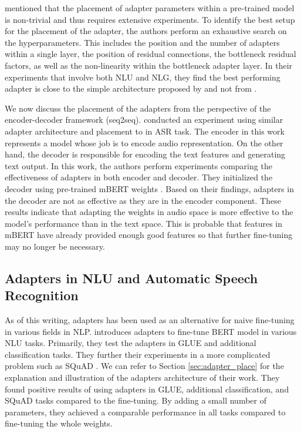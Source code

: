 \cite{pfeiffer2021adapterfusion} mentioned that the placement of adapter parameters within a pre-trained model is non-trivial and thus requires extensive experiments. To identify the best setup for the placement of the adapter, the authors perform an exhaustive search on the hyperparameters. This includes the position and the number of adapters within a single layer, the position of residual connections, the bottleneck residual factors, as well as the non-linearity within the bottleneck adapter layer. In their experiments that involve both NLU and NLG, they find the best performing adapter is close to the simple architecture proposed by \cite{bapna2019simple} and not from \cite{houlsby2019parameter}.

We now discuss the placement of the adapters from the perspective of the encoder-decoder framework (seq2seq). \cite{winata2020adapt} conducted an experiment using similar adapter architecture and placement to \cite{bapna2019simple} in ASR task. The encoder in this work represents a model whose job is to encode audio representation. On the other hand, the decoder is responsible for encoding the text features and generating text output. In this work, the authors perform experiments comparing the effectiveness of adapters in both encoder and decoder. They initialized the decoder using pre-trained mBERT weights \cite{devlin2018bert}. Based on their findings, adapters in the decoder are not as effective as they are in the encoder component. These results indicate that adapting the weights in audio space is more effective to the model's performance than in the text space. This is probable that features in mBERT have already provided enough good features so that further fine-tuning may no longer be necessary.

\subsection{Adapters in NLU and Automatic Speech Recognition}
\label{sec:app_nlu_asr}
As of this writing, adapters has been used as an alternative for naive fine-tuning in various fields in NLP. \cite{houlsby2019parameter} introduces adapters to fine-tune BERT model in various NLU tasks. Primarily, they test the adapters in GLUE \cite{wang2018glue} and additional classification tasks. They further their experiments in a more complicated problem such as SQuAD \cite{rajpurkar2018know}. We can refer to Section \ref{sec:adapter_place} for the explanation and illustration of the adapters architecture of their work. They found positive results of using adapters in GLUE, additional classification, and SQuAD tasks compared to the fine-tuning. By adding a small number of parameters, they achieved a comparable performance in all tasks compared to fine-tuning the whole weights.

